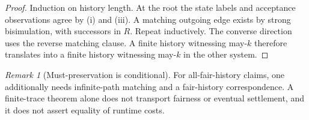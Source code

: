 \documentclass[11pt,letterpaper]{article}
\theoremstyle{definition}\newtheorem{definition}[theorem]{Definition}\newtheorem{example}[theorem]{Example}\newtheorem{protocol}[theorem]{Protocol}\newtheorem{question}[theorem]{Open Problem}
\theoremstyle{remark}\newtheorem{remark}[theorem]{Remark}
\begin{document}
\begin{proof}
Induction on history length. At the root the state labels and acceptance observations agree by (i) and (iii). A matching outgoing edge exists by strong bisimulation, with successors in $R$. Repeat inductively. The converse direction uses the reverse matching clause. A finite history witnessing may-$k$ therefore translates into a finite history witnessing may-$k$ in the other system.
\end{proof}
\begin{remark}[Must-preservation is conditional]
For all-fair-history claims, one additionally needs infinite-path matching and a fair-history correspondence. A finite-trace theorem alone does not transport fairness or eventual settlement, and it does not assert equality of runtime costs.
\end{remark}
\end{document}
